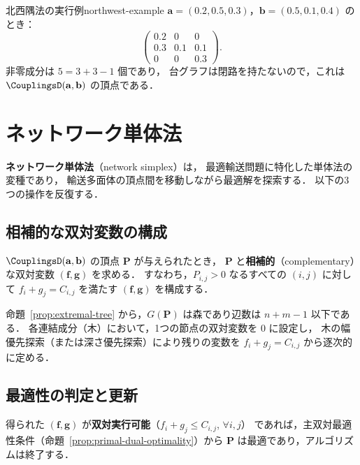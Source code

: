 \begin{example}{北西隅法の実行例}{northwest-example}
  $\mathbf{a} = (0.2, 0.5, 0.3)$，$\mathbf{b} = (0.5, 0.1, 0.4)$ のとき：
  \[
    \begin{pmatrix} 0.2 & 0 & 0 \\ 0.3 & 0.1 & 0.1 \\ 0 & 0 & 0.3 \end{pmatrix}.
  \]
  非零成分は $5 = 3 + 3 - 1$ 個であり，
  台グラフは閉路を持たないので，これは $\CouplingsD(\mathbf{a}, \mathbf{b})$ の頂点である．
\end{example}

\section{ネットワーク単体法}
\label{sec:network-simplex}

\textbf{ネットワーク単体法}（network simplex）は，
最適輸送問題に特化した単体法の変種であり，
輸送多面体の頂点間を移動しながら最適解を探索する．
以下の3つの操作を反復する．

\subsection{相補的な双対変数の構成}
\label{subsec:dual-from-primal}

$\CouplingsD(\mathbf{a}, \mathbf{b})$ の頂点 $\mathbf{P}$ が与えられたとき，
$\mathbf{P}$ と\textbf{相補的}（complementary）な双対変数 $(\mathbf{f}, \mathbf{g})$ を求める．
すなわち，$P_{i,j} > 0$ なるすべての $(i, j)$ に対して $f_i + g_j = C_{i,j}$ を満たす
$(\mathbf{f}, \mathbf{g})$ を構成する．

命題~\ref{prop:extremal-tree} から，$G(\mathbf{P})$ は森であり辺数は $n + m - 1$ 以下である．
各連結成分（木）において，1つの節点の双対変数を $0$ に設定し，
木の幅優先探索（または深さ優先探索）により残りの変数を
$f_i + g_j = C_{i,j}$ から逐次的に定める．

\subsection{最適性の判定と更新}

得られた $(\mathbf{f}, \mathbf{g})$ が\textbf{双対実行可能}（$f_i + g_j \leq C_{i,j}$, $\forall i, j$）
であれば，主双対最適性条件（命題~\ref{prop:primal-dual-optimality}）から
$\mathbf{P}$ は最適であり，アルゴリズムは終了する．

